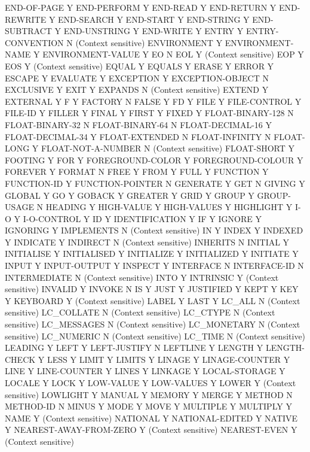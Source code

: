 END-OF-PAGE			Y
END-PERFORM			Y
END-READ			Y
END-RETURN			Y
END-REWRITE			Y
END-SEARCH			Y
END-START			Y
END-STRING			Y
END-SUBTRACT			Y
END-UNSTRING			Y
END-WRITE			Y
ENTRY				Y
ENTRY-CONVENTION		N (Context sensitive)
ENVIRONMENT			Y
ENVIRONMENT-NAME		Y
ENVIRONMENT-VALUE		Y
EO				N
EOL				Y (Context sensitive)
EOP				Y
EOS				Y (Context sensitive)
EQUAL				Y
EQUALS				Y
ERASE				Y
ERROR				Y
ESCAPE				Y
EVALUATE			Y
EXCEPTION			Y
EXCEPTION-OBJECT		N
EXCLUSIVE			Y
EXIT				Y
EXPANDS				N (Context sensitive)
EXTEND				Y
EXTERNAL			Y
F				Y
FACTORY				N
FALSE				Y
FD				Y
FILE				Y
FILE-CONTROL			Y
FILE-ID				Y
FILLER				Y
FINAL				Y
FIRST				Y
FIXED				Y
FLOAT-BINARY-128		N
FLOAT-BINARY-32			N
FLOAT-BINARY-64			N
FLOAT-DECIMAL-16		Y
FLOAT-DECIMAL-34		Y
FLOAT-EXTENDED			N
FLOAT-INFINITY			N
FLOAT-LONG			Y
FLOAT-NOT-A-NUMBER		N (Context sensitive)
FLOAT-SHORT			Y
FOOTING				Y
FOR				Y
FOREGROUND-COLOR		Y
FOREGROUND-COLOUR		Y
FOREVER				Y
FORMAT				N
FREE				Y
FROM				Y
FULL				Y
FUNCTION			Y
FUNCTION-ID			Y
FUNCTION-POINTER		N
GENERATE			Y
GET				N
GIVING				Y
GLOBAL				Y
GO				Y
GOBACK				Y
GREATER				Y
GRID				Y
GROUP				Y
GROUP-USAGE			N
HEADING				Y
HIGH-VALUE			Y
HIGH-VALUES			Y
HIGHLIGHT			Y
I-O				Y
I-O-CONTROL			Y
ID				Y
IDENTIFICATION			Y
IF				Y
IGNORE				Y
IGNORING			Y
IMPLEMENTS			N (Context sensitive)
IN				Y
INDEX				Y
INDEXED				Y
INDICATE			Y
INDIRECT			N (Context sensitive)
INHERITS			N
INITIAL				Y
INITIALISE			Y
INITIALISED			Y
INITIALIZE			Y
INITIALIZED			Y
INITIATE			Y
INPUT				Y
INPUT-OUTPUT			Y
INSPECT				Y
INTERFACE			N
INTERFACE-ID			N
INTERMEDIATE			N (Context sensitive)
INTO				Y
INTRINSIC			Y (Context sensitive)
INVALID				Y
INVOKE				N
IS				Y
JUST				Y
JUSTIFIED			Y
KEPT				Y
KEY				Y
KEYBOARD			Y (Context sensitive)
LABEL				Y
LAST				Y
LC_ALL				N (Context sensitive)
LC_COLLATE			N (Context sensitive)
LC_CTYPE			N (Context sensitive)
LC_MESSAGES			N (Context sensitive)
LC_MONETARY			N (Context sensitive)
LC_NUMERIC			N (Context sensitive)
LC_TIME				N (Context sensitive)
LEADING				Y
LEFT				Y
LEFT-JUSTIFY			N
LEFTLINE			Y
LENGTH				Y
LENGTH-CHECK			Y
LESS				Y
LIMIT				Y
LIMITS				Y
LINAGE				Y
LINAGE-COUNTER			Y
LINE				Y
LINE-COUNTER			Y
LINES				Y
LINKAGE				Y
LOCAL-STORAGE			Y
LOCALE				Y
LOCK				Y
LOW-VALUE			Y
LOW-VALUES			Y
LOWER				Y (Context sensitive)
LOWLIGHT			Y
MANUAL				Y
MEMORY				Y
MERGE				Y
METHOD				N
METHOD-ID			N
MINUS				Y
MODE				Y
MOVE				Y
MULTIPLE			Y
MULTIPLY			Y
NAME				Y (Context sensitive)
NATIONAL			Y
NATIONAL-EDITED			Y
NATIVE				Y
NEAREST-AWAY-FROM-ZERO		Y (Context sensitive)
NEAREST-EVEN			Y (Context sensitive)
